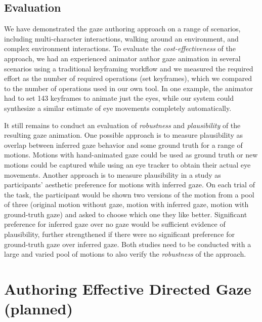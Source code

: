 \subsection{Evaluation}

We have demonstrated the gaze authoring approach on a range of scenarios, including multi-character interactions, walking around an environment, and complex environment interactions. To evaluate the \emph{cost-effectiveness} of the approach, we had an experienced animator author gaze animation in several scenarios using a traditional keyframing workflow and we measured the required effort as the number of required operations (set keyframes), which we compared to the number of operations used in our own tool. In one example, the animator had to set 143 keyframes to animate just the eyes, while our system could synthesize a similar estimate of eye movements completely automatically.

It still remains to conduct an evaluation of \emph{robustness} and \emph{plausibility} of the resulting gaze animation. One possible approach is to measure plausibility as overlap between inferred gaze behavior and some ground truth for a range of motions. Motions with hand-animated gaze could be used as ground truth or new motions could be captured while using an eye tracker to obtain their actual eye movements. Another approach is to measure plausibility in a study as participants' aesthetic preference for motions with inferred gaze. On each trial of the task, the participant would be shown two versions of the motion from a pool of three (original motion without gaze, motion with inferred gaze, motion with ground-truth gaze) and asked to choose which one they like better. Significant preference for inferred gaze over no gaze would be sufficient evidence of plausibility, further strengthened if there were no significant preference for ground-truth gaze over inferred gaze. Both studies need to be conducted with a large and varied pool of motions to also verify the \emph{robustness} of the approach.

\section{Authoring Effective Directed Gaze (planned)}
\label{sec:GazeBehaviorSynthesis}


